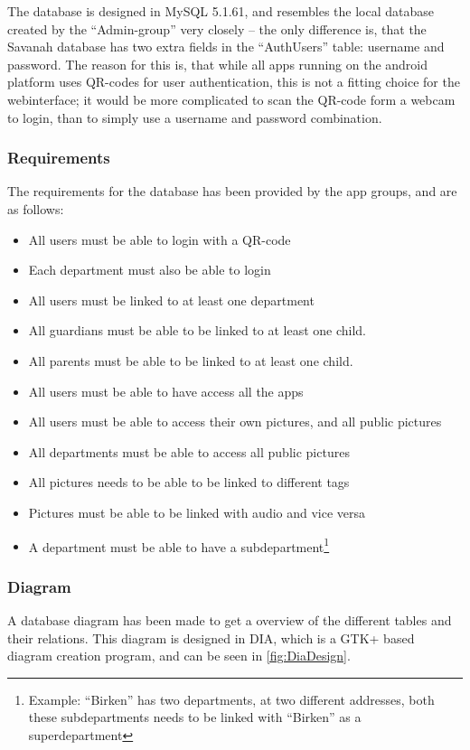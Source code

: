 The database is designed in MySQL 5.1.61, and resembles the local database created by the ``Admin-group'' very closely -- the only difference is, that the Savanah database has two extra fields in the ``AuthUsers'' table: username and password. The reason for this is, that while all apps running on the android platform uses QR-codes for user authentication, this is not a fitting choice for the webinterface; it would be more complicated to scan the QR-code form a webcam to login, than to simply use a username and password combination.

\subsubsection*{Requirements}
The requirements for the database has been provided by the app groups, and are as follows:

\begin{itemize}
	\item All users must be able to login with a QR-code
	\item Each department must also be able to login
	\item All users must be linked to at least one department
	\item All guardians must be able to be linked to at least one child.
	\item All parents must be able to be linked to at least one child.
	\item All users must be able to have access all the apps
	\item All users must be able to access their own pictures, and all public pictures
	\item All departments must be able to access all public pictures
	\item All pictures needs to be able to be linked to different tags
	\item Pictures must be able to be linked with audio and vice versa
	\item A department must be able to have a subdepartment\footnote{Example: ``Birken'' has two departments, at two different addresses, both these subdepartments needs to be linked with ``Birken'' as a superdepartment}
\end{itemize}

\subsubsection*{Diagram}
A database diagram has been made to get a overview of the different tables and their relations. This diagram is designed in DIA, which is a GTK+ based diagram creation program\cite{Dia}, and can be seen in \autoref{fig:DiaDesign}.

